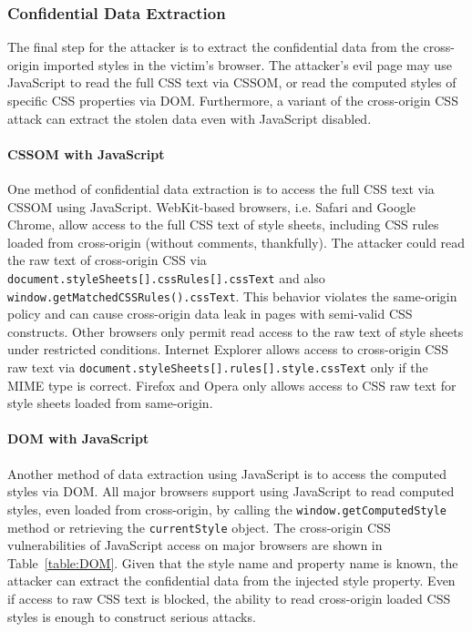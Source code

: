 \documentclass{acm_proc_article-sp}
\begin{document}
\subsubsection{Confidential Data Extraction}
The final step for the attacker is to extract the confidential data from the cross-origin imported styles in the victim's browser. The attacker's evil page may use JavaScript to read the full CSS text via CSSOM, or read the computed styles of specific CSS properties via DOM. Furthermore, a variant of the cross-origin CSS attack can extract the stolen data even with JavaScript disabled. 

\paragraph{CSSOM with JavaScript}
One method of confidential data extraction is to access the full CSS text via CSSOM using JavaScript. WebKit-based browsers, i.e. Safari and Google Chrome, allow access to the full CSS text of style sheets, including CSS rules loaded from cross-origin (without comments, thankfully). The attacker could read the raw text of cross-origin CSS via \texttt{document.styleSheets[].cssRules[].cssText} and also \texttt{window.getMatchedCSSRules().cssText}. This behavior violates the same-origin policy and can cause cross-origin data leak in pages with semi-valid CSS constructs. Other browsers only permit read access to the raw text of style sheets under restricted conditions. Internet Explorer allows access to cross-origin CSS raw text via \texttt{document.styleSheets[].rules[].style.cssText} only if the MIME type is correct. Firefox and Opera only allows access to CSS raw text for style sheets loaded from same-origin.

\paragraph{DOM with JavaScript}
Another method of data extraction using JavaScript is to access the computed styles via DOM. All major browsers support using JavaScript to read computed styles, even loaded from cross-origin, by calling the \texttt{window.getComputedStyle} method or retrieving the \texttt{currentStyle} object. The cross-origin CSS vulnerabilities of JavaScript access on major browsers are shown in Table~\ref{table:DOM}. Given that the style name and property name is known, the attacker can extract the confidential data from the injected style property. Even if access to raw CSS text is blocked, the ability to read cross-origin loaded CSS styles is enough to construct serious attacks.
\end{document}
